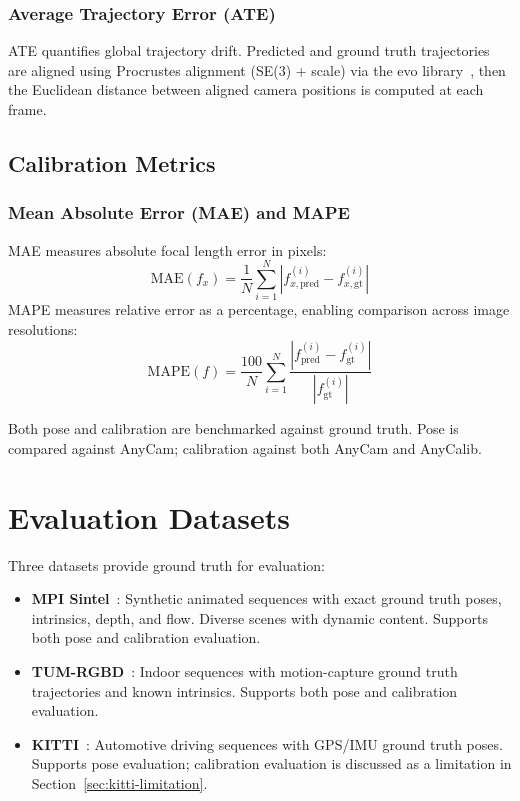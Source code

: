\subsubsection{Average Trajectory Error (ATE)}

ATE quantifies global trajectory drift. Predicted and ground truth trajectories are aligned using Procrustes alignment (SE(3) + scale) via the evo library~\parencite{gruber2017evo}, then the Euclidean distance between aligned camera positions is computed at each frame.

\subsection{Calibration Metrics}\label{sec:calib-metrics}

\subsubsection{Mean Absolute Error (MAE) and MAPE}

MAE measures absolute focal length error in pixels:
\begin{equation}
    \text{MAE}(f_x) = \frac{1}{N} \sum_{i=1}^N |f_{x,\text{pred}}^{(i)} - f_{x,\text{gt}}^{(i)}|
\end{equation}
MAPE measures relative error as a percentage, enabling comparison across image resolutions:
\begin{equation}
    \text{MAPE}(f) = \frac{100}{N} \sum_{i=1}^N \frac{|f_{\text{pred}}^{(i)} - f_{\text{gt}}^{(i)}|}{|f_{\text{gt}}^{(i)}|}
\end{equation}

Both pose and calibration are benchmarked against ground truth. Pose is compared against AnyCam; calibration against both AnyCam and AnyCalib.

\section{Evaluation Datasets}\label{sec:datasets}

Three datasets provide ground truth for evaluation:

\begin{itemize}
    \item \textbf{MPI Sintel}~\parencite{butler2012sintel}: Synthetic animated sequences with exact ground truth poses, intrinsics, depth, and flow. Diverse scenes with dynamic content. Supports both pose and calibration evaluation.

    \item \textbf{TUM-RGBD}~\parencite{sturm2012tumrgbd}: Indoor sequences with motion-capture ground truth trajectories and known intrinsics. Supports both pose and calibration evaluation.

    \item \textbf{KITTI}~\parencite{geiger2012kitti}: Automotive driving sequences with GPS/IMU ground truth poses. Supports pose evaluation; calibration evaluation is discussed as a limitation in Section~\ref{sec:kitti-limitation}.
\end{itemize}


